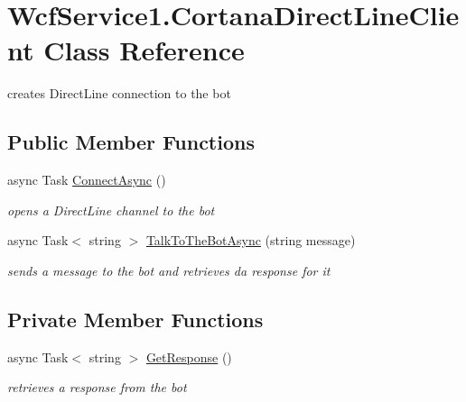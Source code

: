 \hypertarget{class_wcf_service1_1_1_cortana_direct_line_client}{}\section{Wcf\+Service1.\+Cortana\+Direct\+Line\+Client Class Reference}
\label{class_wcf_service1_1_1_cortana_direct_line_client}


creates Direct\+Line connection to the bot  


\subsection*{Public Member Functions}
\begin{DoxyCompactItemize}
\item 
async Task \hyperlink{class_wcf_service1_1_1_cortana_direct_line_client_a71a4d8cff19707b3f6cb0c559b8104f7}{Connect\+Async} ()
\begin{DoxyCompactList}\small\item\em opens a Direct\+Line channel to the bot \end{DoxyCompactList}\item 
async Task$<$ string $>$ \hyperlink{class_wcf_service1_1_1_cortana_direct_line_client_ad9aee7d49dab0e3bb8806349b68716b3}{Talk\+To\+The\+Bot\+Async} (string message)
\begin{DoxyCompactList}\small\item\em sends a message to the bot and retrieves da response for it \end{DoxyCompactList}\end{DoxyCompactItemize}
\subsection*{Private Member Functions}
\begin{DoxyCompactItemize}
\item 
async Task$<$ string $>$ \hyperlink{class_wcf_service1_1_1_cortana_direct_line_client_a0bc2576ae50d7eafd2092bb9cf7e6f7c}{Get\+Response} ()
\begin{DoxyCompactList}\small\item\em retrieves a response from the bot \end{DoxyCompactList}\end{DoxyCompactItemize}
